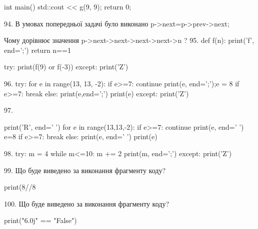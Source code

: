 \documentclass[11pt]{article}
\begin{document}
int main(){
    std::cout << g(9, 9);
    return 0;
}

94. 
В умовах попередньої задачі було виконано p->next=p->prev->next;

Чому дорівнює значення p->next->next->next->next->n ?
95. 
def f(n):
    print('f', end=';')
    return n==1

try:
    print(f(9) or f(-3))
except:
    print('Z')

96. 
try:
    for e in range(13, 13, -2):
        if e>=7:
            continue
        print(e, end=';');e = 8
        if e>=7:
            break
    else:
        print(e,end=';')
    print(e)
except:
    print('Z')

97. 

print('R', end=' ')
for e in range(13,13,-2):
    if e>=7:
        continue
        print(e, end=' ')
        e=8
    if e>=7:
        break
    else:
        print(e, end=' ')
    print(e)

98. 
try:
    m = 4
    while m<=10:
        m += 2
    print(m, end=';')
except:
    print('Z')

99. Що буде виведено за виконання фрагменту коду?

print(8//8%

100. Що буде виведено за виконання фрагменту коду?

print("6.0j" == "False")
\end{document}
